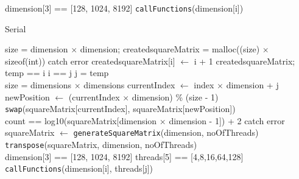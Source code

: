\documentclass[10pt,twocolumn]{witseiepaper}
\begin{document}
\begin{appendix}
\begin{algorithm}[htbp]
\begin{algorithmic}
		\State dimension[3] == [128, 1024, 8192]
		\State \verb|callFunctions|(dimension[i])
		\EndFor
		\State {}
		\EndFunction
		
		\caption{Serial}
		\label{alg:2}
	\end{algorithmic}
\end{algorithm}

\begin{algorithm}[htbp]
	\begin{algorithmic}
		
		\State size = dimension $\times$ dimension;
		\State created\textunderscore squareMatrix = malloc((size) $\times$ sizeof(int))
		\State catch error
		\EndIf
		\State created\textunderscore squareMatrix[i] $\leftarrow$ i + 1
		\EndFor
		\EndFunction
		\State \Return created\textunderscore squareMatrix; \\
		
		\State temp == i
		\State i == j
		\State j = temp
		\EndFunction \\
		
		\State size = dimensions $\times$ dimensions
		\State currentIndex $\leftarrow$ index $\times$ dimension + j
		\State newPosition $\leftarrow$ (currentIndex $\times$ dimension) \% (size - 1)
		\EndFor
		\EndFor
		\State \verb|swap|(squareMatrix[currentIndex], squareMatrix[newPosition])
		\EndFunction \\
		
		\State count == log10(squareMatrix[dimension $\times$ dimension - 1]) + 2
		\State catch error
		\EndIf
		\EndFor
		\EndFunction \\
		
		\State squareMatrix $\leftarrow$ \verb|generateSquareMatrix|(dimension, noOfThreads)
		\State \verb|transpose|(squareMatrix, dimension, noOfThreads)
		\EndFunction \\
		
		\State dimension[3] == [128, 1024, 8192]
		\State threads[5] == [4,8,16,64,128]
		\State \verb|callFunctions|(dimension[i], threads[j])
		\EndFor
		\EndFor
		\State {}
		\EndFunction
		

\end{algorithmic}
\end{algorithm}
\end{appendix}
\end{document}
